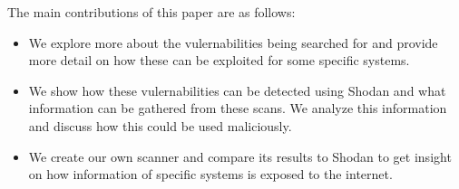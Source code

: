 The main contributions of this paper are as follows:
\begin{itemize}
    \item We explore more about the vulernabilities being searched for and
        provide more detail on how these can be exploited for some specific
        systems.
    \item We show how these vulernabilities can be detected using Shodan
        and what information can be gathered from these scans. We analyze
        this information and discuss how this could be used maliciously.
    \item We create our own scanner and compare its results to Shodan to
        get insight on how information of specific systems is exposed to
        the internet.
\end{itemize}
